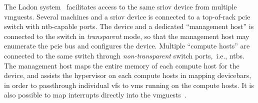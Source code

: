 The Ladon system~\cite{Tu2013} facilitates access to the same \gls{sriov} device from multiple \glspl{vmguest}.
%
Several machines and a \gls{sriov} device is connected to a top-of-rack \gls{pcie} switch with \gls{ntb}-capable ports.
%
The device and a dedicated ``management host'' is connected to the switch in \emph{transparent} mode, so that the management host may enumerate the \gls{pcie} bus and configures the device.
%
Multiple ``compute hosts'' are connected to the same switch through \emph{non-transparent} switch ports,~i.e., \glspl{ntb}.
%
The management host maps the entire memory of each compute host for the device, and assists the \gls{hypervisor} on each compute hosts in mapping \glspl{devicebar}, in order to \gls{passthrough} individual \glspl{vf} to \glspl{vm} running on the compute hosts.
%
It is also possible to map interrupts directly into the \glspl{vmguest}~\cite{Tu2014phd,Tu2015}.



